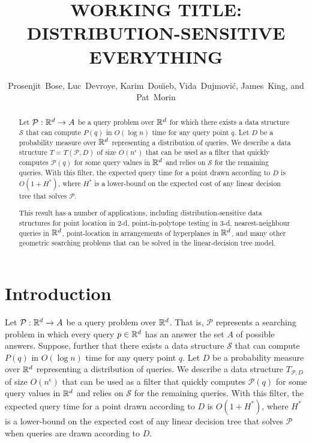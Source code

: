\documentclass{patmorin}
\title{\MakeUppercase{Working Title: Distribution-Sensitive Everything}}
\author{Prosenjit~Bose, 
        Luc~Devroye,
	Karim~Dou\"{\i}eb, 
	Vida~Dujmovi\'c, 
	James~King, and 
	Pat~Morin}
\newcommand{\eps}{\epsilon}
\begin{document}
\maketitle

\begin{abstract}
Let $\mathcal{P}:\mathbb{R}^d\rightarrow A$ be a query problem over
$\mathbb{R}^d$ for which there exists a data structure $\mathcal{S}$ that can
compute $P(q)$ in $O(\log n)$ time for any query point $q$.  Let $D$ be a
probability measure over $\mathbb{R}^d$ representing a distribution of queries.
We describe a data structure $T=T(\mathcal{P},D)$ of size $O(n^\eps)$
that can be used as a filter that quickly computes $\mathcal{P}(q)$
for some query values in $\mathbb{R}^d$ and relies on $\mathcal{S}$ for the
remaining queries.  With this filter, the expected query time for a point
drawn according to $D$ is $O(1+ H^*)$, where $H^*$ is a lower-bound on
the expected cost of any linear decision tree that solves $\mathcal{P}$.

This result has a number of applications, including distribution-sensitive
data structures for point location in 2-d, point-in-polytope testing in
3-d, nearest-neighbour queries in $\mathbb{R}^d$, point-location in arrangements
of hyperplanes in $\mathbb{R}^d$, and many other geometric searching problems
that can be solved in the linear-decision tree model.
\end{abstract}

\section{Introduction}

Let $\mathcal{P}:\mathbb{R}^d\rightarrow A$ be a query problem over $\mathbb{R}^d$.
That is, $\mathcal{P}$ represents a searching problem in which every query
$p\in\mathbb{R}^d$ has an answer the set $A$ of possible answers.  Suppose,
further that there exists a data structure $\mathcal{S}$ that can
compute $P(q)$ in $O(\log n)$ time for any query point $q$. Let $D$ be a
probability measure over $\mathbb{R}^d$ representing a distribution of queries.
We describe a data structure $T_{\mathcal{P},D}$ of size $O(n^{\eps})$
that can be used as a filter that quickly computes $\mathcal{P}(q)$
for some query values in $\mathbb{R}^d$ and relies on $\mathcal{S}$ for the
remaining queries.  With this filter, the expected query time for a point
drawn according to $D$ is $O(1+ H^*)$, where $H^*$ is a lower-bound on
the expected cost of any linear decision tree that solves $\mathcal{P}$
when queries are drawn according to $D$.
\end{document}
